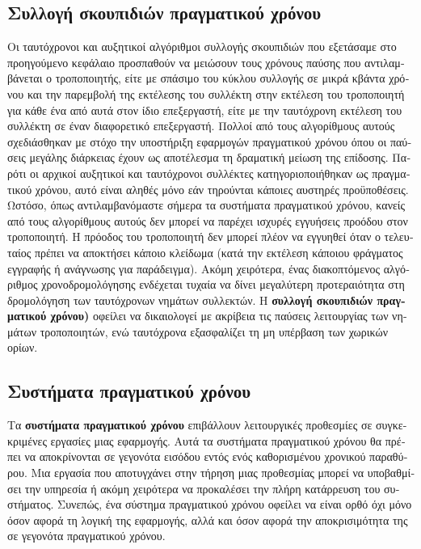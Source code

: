 \begin{greek}
\chapter{Συλλογή σκουπιδιών πραγματικού χρόνου}\label{ch:rt}
Οι ταυτόχρονοι και αυξητικοί αλγόριθμοι συλλογής σκουπιδιών
που εξετάσαμε στο προηγούμενο κεφάλαιο προσπαθούν να μειώσουν
τους χρόνους παύσης που αντιλαμβάνεται ο τροποποιητής, είτε
με σπάσιμο του κύκλου συλλογής σε μικρά κβάντα χρόνου και την
παρεμβολή της εκτέλεσης του συλλέκτη στην εκτέλεση του τροποποιητή
για κάθε ένα από αυτά στον ίδιο επεξεργαστή, είτε με την ταυτόχρονη
εκτέλεση του συλλέκτη σε έναν διαφορετικό επεξεργαστή. Πολλοί
από τους αλγορίθμους αυτούς σχεδιάσθηκαν με στόχο την υποστήριξη
εφαρμογών πραγματικού χρόνου όπου οι παύσεις μεγάλης διάρκειας
έχουν ως αποτέλεσμα τη δραματική μείωση της επίδοσης. Παρότι
οι αρχικοί αυξητικοί και ταυτόχρονοι συλλέκτες κατηγοριοποιήθηκαν
ως πραγματικού χρόνου, αυτό είναι αληθές μόνο εάν τηρούνται
κάποιες αυστηρές προϋποθέσεις. Ωστόσο, όπως αντιλαμβανόμαστε
σήμερα τα συστήματα πραγματικού χρόνου, κανείς από τους αλγορίθμους
αυτούς δεν μπορεί να παρέχει ισχυρές εγγυήσεις προόδου στον
τροποποιητή. Η πρόοδος του τροποποιητή δεν μπορεί πλέον να
εγγυηθεί όταν ο τελευταίος πρέπει να αποκτήσει κάποιο κλείδωμα
(κατά την εκτέλεση κάποιου φράγματος εγγραφής ή ανάγνωσης για
παράδειγμα). Ακόμη χειρότερα, ένας διακοπτόμενος αλγόριθμος χρονοδρομολόγησης
ενδέχεται τυχαία να δίνει μεγαλύτερη προτεραιότητα στη δρομολόγηση
των ταυτόχρονων νημάτων συλλεκτών. Η \textbf{συλλογή σκουπιδιών
πραγματικού χρόνου)} οφείλει να δικαιολογεί με ακρίβεια
τις παύσεις λειτουργίας των νημάτων τροποποιητών, ενώ ταυτόχρονα
εξασφαλίζει τη μη υπέρβαση των χωρικών ορίων.

\section{Συστήματα πραγματικού χρόνου}
Τα \textbf{συστήματα πραγματικού χρόνου} επιβάλλουν λειτουργικές
προθεσμίες σε συγκεκριμένες εργασίες μιας εφαρμογής. Αυτά τα
συστήματα πραγματικού χρόνου θα πρέπει να αποκρίνονται σε
γεγονότα εισόδου εντός ενός καθορισμένου χρονικού παραθύρου.
Μια εργασία που αποτυγχάνει στην τήρηση μιας προθεσμίας μπορεί
να υποβαθμίσει την υπηρεσία ή ακόμη χειρότερα να προκαλέσει
την πλήρη κατάρρευση του συστήματος. Συνεπώς, ένα σύστημα
πραγματικού χρόνου οφείλει να είναι ορθό όχι μόνο όσον αφορά
τη λογική της εφαρμογής, αλλά και όσον αφορά την αποκρισιμότητα
της σε γεγονότα πραγματικού χρόνου.


\end{greek}
